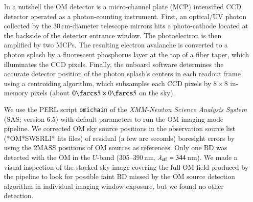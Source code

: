 \documentclass{aa}
\begin{document}
In a nutshell the OM detector is a micro-channel plate (MCP)
intensified CCD detector operated as a photon-counting instrument.
First, an optical/UV photon collected by the 30\,cm-diameter
telescope mirrors hits a photo-cathode located at the backside of the
detector entrance window. The photoelectron is then amplified by two
MCPs. The resulting electron avalanche is converted to a photon splash
by a fluorescent phosphorus layer at the top of a fiber taper, which
illuminates the CCD pixels. Finally, the onboard
software determines the accurate detector position of the photon
splash's centers in each readout frame using a centroiding algorithm,
which subsamples each CCD pixels by $8\times8$ in-memory pixels (about
$0\farcs5\times0\farcs5$ on the sky).

We use the PERL script {\tt omichain} of the {\it XMM-Newton Science
Analysis System} (SAS; version 6.5) with default parameters to run
the OM imaging mode pipeline. We corrected OM sky source positions
in the observation source list (*OM*SWSRLI* fits files) of residual (a
few arc seconds) boresight errors by using the 2MASS positions of OM
sources as references. Only one BD was detected with the OM in the 
$U$-band (305--390\,nm, $\lambda_{\rm eff}=344$\,nm). We made a visual
inspection of the stacked sky image covering the full OM field
produced by the pipeline to look for possible faint BD missed by the
OM source detection algorithm in individual imaging window exposure,
but we found no other detection.
\end{document}
